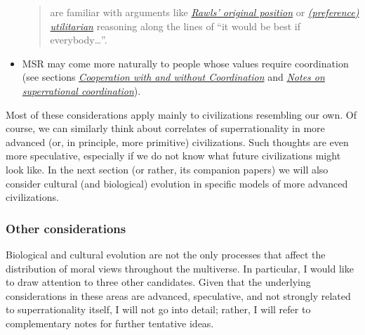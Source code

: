 \begin{itemize}
\begin{quote}
  are familiar with arguments like
  \href{https://en.wikipedia.org/wiki/Original_position}{\emph{Rawls'
  original position}} \parencite{Freeman2016-kg} or
  \href{https://en.wikipedia.org/wiki/Preference_utilitarianism}{\emph{(preference)
  utilitarian}} reasoning along the lines of ``it would be best if
  everybody\ldots{}''.
  \end{quote}
\item
  MSR may come more naturally to people whose values require
  coordination (see sections
  \protect\hyperlink{cooperation-with-and-without-coordination}{\emph{Cooperation
  with and without Coordination}} and
  \protect\hyperlink{notes-on-superrational-coordination}{\emph{Notes
  on superrational coordination}}).
\end{itemize}

Most of these considerations apply mainly to civilizations resembling
our own. Of course, we can similarly think about correlates of
superrationality in more advanced (or, in principle, more primitive)
civilizations. Such thoughts are even more speculative, especially if we
do not know what future civilizations might look like. In the next
section (or rather, its companion papers) we will also consider cultural
(and biological) evolution in specific models of more advanced
civilizations.

\hypertarget{other-considerations}{\subsubsection{Other
considerations}\label{other-considerations}}

Biological and cultural evolution are not the only processes that affect
the distribution of moral views throughout the multiverse. In
particular, I would like to draw attention to three other candidates.
Given that the underlying considerations in these areas are advanced,
speculative, and not strongly related to superrationality itself, I will
not go into detail; rather, I will refer to complementary notes for
further tentative ideas.

